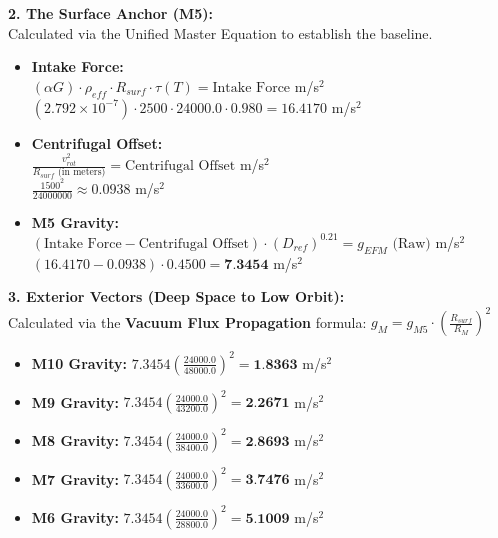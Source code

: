 \documentclass[11pt, a4paper]{article}
\begin{document}
  \vspace{1.0em}
  \noindent \textbf{2. The Surface Anchor (M5):} \\
  \hspace*{1em} Calculated via the Unified Master Equation to establish the baseline.
  \begin{itemize}
    \item \textbf{Intake Force:} \\[0.5em]
    \hspace*{2em} $(\alpha G) \cdot \rho_{eff} \cdot R_{surf} \cdot \tau(T) = \text{Intake Force}$ m/s$^2$ \\[1em]
    \hspace*{2em} $(2.792 \times 10^{-7}) \cdot 2500 \cdot 24000.0 \cdot 0.980 = 16.4170$ m/s$^2$
    
    \item \textbf{Centrifugal Offset:} \\[0.5em]
    \hspace*{2em} $\frac{v_{rot}^2}{R_{surf} \text{ (in meters)}} = \text{Centrifugal Offset}$ m/s$^2$ \\[1em]
    \hspace*{2em} $\frac{1500^2}{24000000} \approx 0.0938$ m/s$^2$
    
    \item \textbf{M5 Gravity:} \\[0.5em]
    \hspace*{2em} $(\text{Intake Force} - \text{Centrifugal Offset}) \cdot (D_{ref})^{0.21} = g_{EFM} \text{ (Raw)}$ m/s$^2$ \\[1em]
    \hspace*{2em} $(16.4170 - 0.0938) \cdot 0.4500 = \textbf{7.3454}$ m/s$^2$
  \end{itemize}

  \clearpage
  \noindent \textbf{3. Exterior Vectors (Deep Space to Low Orbit):} \\
  \hspace*{1em} Calculated via the \textbf{Vacuum Flux Propagation} formula: $g_M = g_{M5} \cdot \left( \frac{R_{surf}}{R_M} \right)^2$
  \begin{itemize}
    \item \textbf{M10 Gravity:} $7.3454 \left( \frac{24000.0}{48000.0} \right)^2 = \textbf{1.8363}$ m/s$^2$
    \item \textbf{M9 Gravity:} $7.3454 \left( \frac{24000.0}{43200.0} \right)^2 = \textbf{2.2671}$ m/s$^2$
    \item \textbf{M8 Gravity:} $7.3454 \left( \frac{24000.0}{38400.0} \right)^2 = \textbf{2.8693}$ m/s$^2$
    \item \textbf{M7 Gravity:} $7.3454 \left( \frac{24000.0}{33600.0} \right)^2 = \textbf{3.7476}$ m/s$^2$
    \item \textbf{M6 Gravity:} $7.3454 \left( \frac{24000.0}{28800.0} \right)^2 = \textbf{5.1009}$ m/s$^2$
  \end{itemize}
\end{document}
